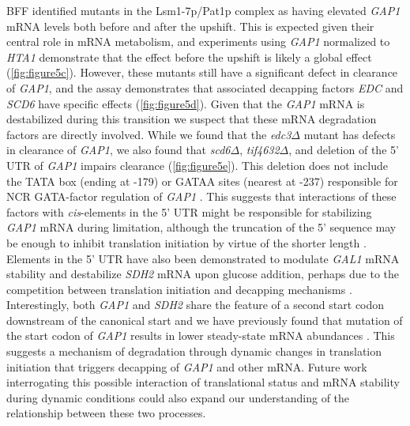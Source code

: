 {BFF identified mutants in the Lsm1-7p/Pat1p
complex as having elevated \textit{GAP1} mRNA levels both before and after the
upshift. This is expected given their central role in mRNA 
metabolism, and experiments using \textit{GAP1} normalized to
\textit{HTA1} demonstrate that the effect before the upshift is
likely a global effect (\autoref{fig:figure5c}). 
However, these mutants still have a
significant defect in clearance of \textit{GAP1},
and the assay demonstrates that associated decapping factors 
\textit{EDC} and \textit{SCD6} have specific effects
(\autoref{fig:figure5d}).
Given that the \textit{GAP1} mRNA is destabilized during this
transition we suspect that these mRNA degradation factors are
directly involved. 
While we found that the \textit{edc3}$\Delta$ mutant has defects in
clearance of \textit{GAP1}, we also 
found that \textit{scd6}$\Delta$,
\textit{tif4632}$\Delta$, and deletion of the 5' UTR
of \textit{GAP1} impairs clearance (\autoref{fig:figure5e}). 
This deletion does not include the TATA box (ending at -179) or
GATAA sites (nearest at -237) responsible for NCR GATA-factor
regulation of \textit{GAP1} \parencite{stanbrough1996two}.
This suggests that interactions of
these factors with \textit{cis}-elements in the 5’ UTR might be responsible for
stabilizing \textit{GAP1} mRNA during limitation, although the 
truncation of the 5' sequence may be enough to inhibit translation 
initiation by virtue of the shorter length
\parencite{arribere2013roles}.
Elements in the 5’ UTR have
also been demonstrated to modulate \textit{GAL1} mRNA stability
\parencite{baumgartner2011antagonistic} and destabilize \textit{SDH2} mRNA upon glucose
addition, perhaps due to the competition between translation
initiation and decapping mechanisms \parencite{de2002role}.
Interestingly, both \textit{GAP1} and \textit{SDH2} 
share the feature of a second start
codon downstream of the canonical start
\parencite{neymotin2016multiple} and
we have previously found that mutation of
the start codon of \textit{GAP1} results in lower
steady-state mRNA abundances \parencite{neymotin2016multiple}.
This
suggests a mechanism of degradation through dynamic changes in 
translation initiation that triggers decapping of \textit{GAP1} 
and other mRNA. 
Future work interrogating
this possible interaction of translational status and mRNA
stability during dynamic conditions could also expand our understanding of
the relationship between these two processes.

}
